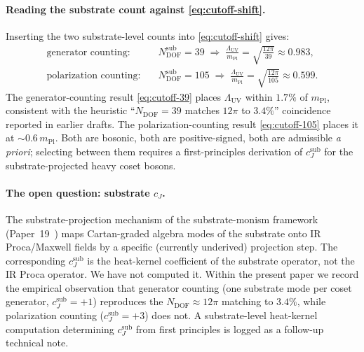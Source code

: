 \documentclass[11pt]{article}
\newcommand{\mPl}{m_{\mathrm{Pl}}}
\begin{document}
\paragraph{Reading the substrate count against \eqref{eq:cutoff-shift}.}
Inserting the two substrate-level counts into \eqref{eq:cutoff-shift}
gives:
\begin{align}
  \text{generator counting:} & \quad
    N_{\mathrm{DOF}}^{\mathrm{sub}} = 39
    \;\Longrightarrow\;
    \frac{\Lambda_{\mathrm{UV}}}{\mPl}
    = \sqrt{\tfrac{12\pi}{39}}
    \approx 0.983,
    \label{eq:cutoff-39}\\
  \text{polarization counting:} & \quad
    N_{\mathrm{DOF}}^{\mathrm{sub}} = 105
    \;\Longrightarrow\;
    \frac{\Lambda_{\mathrm{UV}}}{\mPl}
    = \sqrt{\tfrac{12\pi}{105}}
    \approx 0.599.
    \label{eq:cutoff-105}
\end{align}
The generator-counting result \eqref{eq:cutoff-39} places
$\Lambda_{\mathrm{UV}}$ within $1.7\%$ of $\mPl$, consistent with
the heuristic ``$N_{\mathrm{DOF}} = 39$ matches $12\pi$ to $3.4\%$''
coincidence reported in earlier drafts.  The polarization-counting
result \eqref{eq:cutoff-105} places it at $\sim 0.6\,\mPl$.  Both
are bosonic, both are positive-signed, both are admissible \emph{a
priori}; selecting between them requires a first-principles
derivation of $c_J^{\mathrm{sub}}$ for the substrate-projected
heavy coset bosons.

\paragraph{The open question: substrate $c_J$.}
The substrate-projection mechanism of the substrate-monism
framework (Paper~19~\cite{paper19}) maps Cartan-graded
algebra modes of the substrate onto IR Proca/Maxwell fields by a
specific (currently underived) projection step.  The corresponding
$c_J^{\mathrm{sub}}$ is the heat-kernel coefficient of the
substrate operator, not the IR Proca operator.  We have not
computed it.  Within the present paper we record the empirical
observation that generator counting (one substrate mode per coset
generator, $c_J^{\mathrm{sub}} = +1$) reproduces the
$N_{\mathrm{DOF}} \approx 12\pi$ matching to $3.4\%$, while
polarization counting ($c_J^{\mathrm{sub}} = +3$) does not.  A
substrate-level heat-kernel computation determining
$c_J^{\mathrm{sub}}$ from first principles is logged as a follow-up
technical note.
\end{document}

